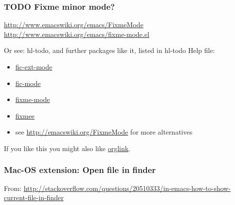 \documentclass{article}
\begin{document}
\subsubsection{{\bfseries\sffamily TODO} Fixme minor mode?}
\label{sec-1-11-19}

\url{http://www.emacswiki.org/emacs/FixmeMode}
\url{http://www.emacswiki.org/emacs/fixme-mode.el}

Or see: hl-todo, and further packages like it, listed in hl-todo Help file:

\begin{itemize}
\item \href{http://emacswiki.org/fic-ext-mode.el}{fic-ext-mode}
\item \href{https://github.com/lewang/fic-mode}{fic-mode}
\item \href{http://emacswiki.org/FixmeMode}{fixme-mode}
\item \href{https://github.com/rolandwalker/fixmee}{fixmee}
\item see \url{http://emacswiki.org/FixmeMode} for more alternatives
\end{itemize}

If you like this you might also like \href{https://github.com/tarsius/orglink}{orglink}.
\subsubsection{Mac-OS extension: Open file in finder}
\label{sec-1-11-20}

From: \url{http://stackoverflow.com/questions/20510333/in-emacs-how-to-show-current-file-in-finder}
\end{document}
